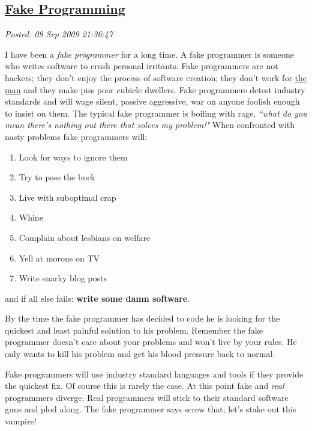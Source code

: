 %

\subsection*{\href{http://bakerjd99.wordpress.com/2009/09/09/fake-progamming/}{Fake Programming}}


\noindent\emph{Posted: 09 Sep 2009 21:36:47}
\vspace{6pt}

I have been a \emph{fake programmer} for a long time. A fake programmer
is someone who writes software to crush personal irritants. Fake
programmers are not hackers; they don't enjoy the process of software
creation; they don't work for
\href{http://en.wikipedia.org/wiki/The\_Man} {the man} and they make piss
poor cubicle dwellers. Fake programmers detest industry standards and
will wage silent, passive aggressive, war on anyone foolish enough to
insist on them. The typical fake programmer is boiling with rage,
\emph{``what do you mean there's nothing out there that solves my
problem!"} When confronted with nasty problems fake programmers will:

\begin{enumerate}
\tightlist
\item
  Look for ways to ignore them
\item
  Try to pass the buck
\item
  Live with suboptimal crap
\item
  Whine
\item
  Complain about lesbians on welfare
\item
  Yell at morons on TV
\item
  Write snarky blog posts
\end{enumerate}
and if all else fails: \textbf{write some damn software}.

By the time the fake programmer has decided to code he is looking for
the quickest and least painful solution to his problem. Remember the
fake programmer doesn't care about your problems and won't live by your
rules. He only wants to kill his problem and get his blood pressure back
to normal.

Fake programmers will use industry standard languages and tools if they
provide the quickest fix. Of course this is rarely the case. At this
point fake and \emph{real} programmers diverge. Real programmers will
stick to their standard software guns and plod along. The fake
programmer says screw that; let's stake out this vampire!

